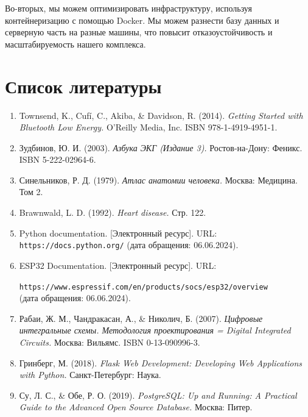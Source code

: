 \documentclass[12pt, russian]{extarticle}
\begin{document}
\begin{spacing}{1.5}
Во-вторых, мы можем оптимизировать инфраструктуру, используя контейнеризацию с помощью Docker. Мы можем разнести базу данных и серверную часть на разные машины, что повысит отказоустойчивость и масштабируемость нашего комплекса.

\newpage
\section{Список литературы}

\begin{enumerate}
    \item Townsend, K., Cufí, C., Akiba, \& Davidson, R. (2014). \textit{Getting Started with Bluetooth Low Energy.} O'Reilly Media, Inc. ISBN 978-1-4919-4951-1.
    
    \item Зудбинов, Ю. И. (2003). \textit{Азбука ЭКГ (Издание 3).} Ростов-на-Дону: Феникс. ISBN 5-222-02964-6.
    
    \item Синельников, Р. Д. (1979). \textit{Атлас анатомии человека.} Москва: Медицина. Том 2.
    
    \item Brawnwald, L. D. (1992). \textit{Heart disease.} Стр. 122.
    
    \item Python documentation. [Электронный ресурс]. URL: \texttt{https://docs.python.org/} (дата обращения: 06.06.2024).
    
    \item ESP32 Documentation. [Электронный ресурс]. URL: 
    
    \texttt{https://www.espressif.com/en/products/socs/esp32/overview} \\ (дата обращения: 06.06.2024).
    
    \item Рабаи, Ж. М., Чандракасан, А., \& Николич, Б. (2007). \textit{Цифровые интегральные схемы. Методология проектирования = Digital Integrated Circuits.} Москва: Вильямс. ISBN 0-13-090996-3.
    
    \item Гринберг, М. (2018). \textit{Flask Web Development: Developing Web Applications with Python.} Санкт-Петербург: Наука.
    
    \item Су, Л. С., \& Обе, Р. О. (2019). \textit{PostgreSQL: Up and Running: A Practical Guide to the Advanced Open Source Database.} Москва: Питер.
    

\end{enumerate}
\end{spacing}
\end{document}
